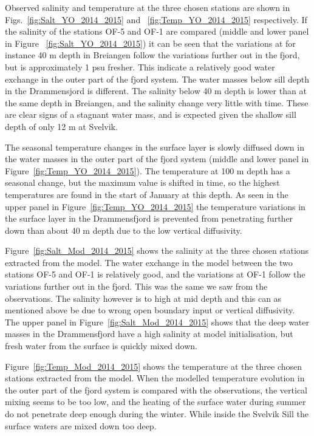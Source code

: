 Observed salinity and temperature at the three chosen stations are shown in Figs.~\ref{fig:Salt_YO_2014_2015} and ~\ref{fig:Temp_YO_2014_2015} respectively. If the salinity of the stations OF-5 and OF-1 are compared (middle and lower panel in Figure ~\ref{fig:Salt_YO_2014_2015}) it can be seen that the variations at for instance 40 m depth in Breiangen follow the variations further out in the fjord, but is approximately 1 psu fresher. This indicate a relatively good water exchange in the outer part of the fjord system. The water masses below sill depth in the Drammensjord is different. The salinity below 40 m depth is lower than at the same depth in Breiangen, and the salinity change very little with time. These are clear signs of a stagnant water mass, and is expected given the shallow sill depth of only 12 m at Svelvik.   

The seasonal temperature changes in the surface layer is slowly diffused down in the water masses in the outer part of the fjord system (middle and lower panel in Figure~\ref{fig:Temp_YO_2014_2015}). The temperature at 100 m depth has a seasonal change, but the maximum value is shifted in time, so the highest temperatures are found in the start of January at this depth. As seen in the upper panel in Figure~\ref{fig:Temp_YO_2014_2015} the temperature variations in the surface layer in the Drammensfjord is prevented from penetrating further down than about 40 m depth due to the low vertical diffusivity.

Figure~\ref{fig:Salt_Mod_2014_2015} shows the salinity at the three chosen stations extracted from the model. The water exchange in the model between the two stations OF-5 and OF-1 is relatively good, and the variations at OF-1 follow the variations further out in the fjord. This was the same we saw from the observations. The salinity however is to high at mid depth and this can as mentioned above be due to wrong open boundary input or vertical diffusivity. The upper panel in Figure~\ref{fig:Salt_Mod_2014_2015} shows that the deep water masses in the Drammensfjord have a high salinity at model initialisation, but fresh water from the surface is quickly mixed down.   

Figure~\ref{fig:Temp_Mod_2014_2015} shows the temperature at the three chosen stations extracted from the model. When the modelled temperature evolution in the outer part of the fjord system is compared with the observations, the vertical mixing seems to be too low, and the heating of the surface water during summer do not penetrate deep enough during the winter. While inside the Svelvik Sill the surface waters are mixed down too deep.


